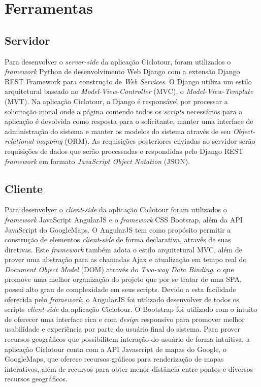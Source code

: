\section{\esp Ferramentas}

\subsection{Servidor}
Para desenvolver o \textit{server-side} da aplicação Ciclotour, foram utilizados o \textit{framework} Python de desenvolvimento Web Django com a 
extensão Django REST Framework para construção de \textit{Web Services}. O Django utiliza um estilo arquitetural baseado no 
\textit{Model-View-Controller} (MVC), o \textit{Model-View-Template} (MVT). Na aplicação Ciclotour, o Django é responsável por processar a 
solicitação inicial onde a página contendo todos os \textit{scripts} necessários para a aplicação é devolvida como resposta para o solicitante,
manter uma interface de administração do sistema e manter os modelos do sistema através de seu \textit{Object-relational mapping} (ORM). 
As requisições posteriores enviadas ao servidor serão requisições de dados que serão processadas e respondidas pelo Django REST \textit{framework} 
em formato \textit{JavaScript Object Notation} (JSON).

\subsection{Cliente}
Para desenvolver o \textit{client-side} da aplicação Ciclotour foram utilizados o \textit{framework} JavaScript AngularJS e o \textit{framework} 
CSS Bootsrap, além da API JavaScript do GoogleMaps. O AngularJS tem como propósito permitir a construção de elementos \textit{client-side} de forma 
declarativa, através de suas diretivas. Este \textit{framework} também adota o estilo arquitetural MVC, além de prover uma abstração para as chamadas
Ajax e atualização em tempo real do \textit{Document Object Model} (DOM) através do \textit{Two-way Data Binding}, o que promove uma melhor 
organização do projeto que por se tratar de uma SPA, possui alto grau de complexidade em seus scripts. Devido a esta facilidade oferecida pelo 
\textit{framework}, o AngularJS foi utilizado desenvolver de todos os scripts \textit{client-side} da aplicação Ciclotour. O Bootstrap foi utilizado 
com o intuito de oferecer uma interface rica e com \textit{design} responsivo para promover melhor usabilidade e experiência por parte do usuário 
final do sistema. Para prover recursos geográficos que possibilitem interação do usuário de forma intuitiva, a aplicação Ciclotour conta com a API 
Javascript de mapas do Google, o GoogleMaps, que oferece recursos gráficos para renderização de mapas interativos, além de recursos para obter menor 
distância entre pontos e diversos recursos geográficos.

